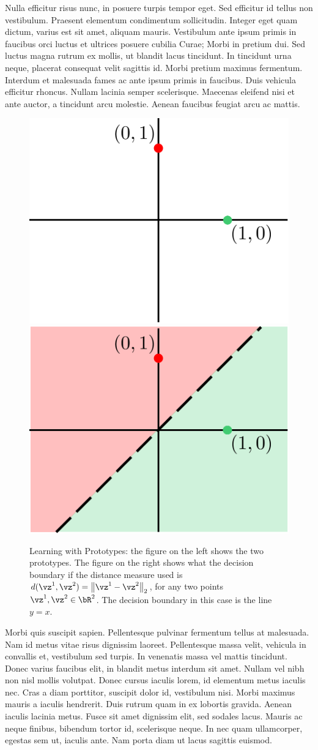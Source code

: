 \documentclass[a4paper,11pt]{article}
\begin{document}
\begin{mlsolution}
Nulla efficitur risus nunc, in posuere turpis tempor eget. Sed efficitur id tellus non vestibulum. Praesent elementum condimentum sollicitudin. Integer eget quam dictum, varius est sit amet, aliquam mauris. Vestibulum ante ipsum primis in faucibus orci luctus et ultrices posuere cubilia Curae; Morbi in pretium dui. Sed luctus magna rutrum ex mollis, ut blandit lacus tincidunt. In tincidunt urna neque, placerat consequat velit sagittis id. Morbi pretium maximus fermentum. Interdum et malesuada fames ac ante ipsum primis in faucibus. Duis vehicula efficitur rhoncus. Nullam lacinia semper scelerisque. Maecenas eleifend nisi et ante auctor, a tincidunt arcu molestie. Aenean faucibus feugiat arcu ac mattis.
\begin{figure}[th]%
\centering
\includegraphics[width=0.5\columnwidth]{proto_blank.png}%
\hfill
\includegraphics[width=0.5\columnwidth]{proto_euclid_sample.png}%
\caption{Learning with Prototypes: the figure on the left shows the two prototypes. The figure on the right shows what the decision boundary if the distance measure used is $d(\vz^1,\vz^2) = \norm{\vz^1-\vz^2}_2$, for any two points $\vz^1,\vz^2 \in \bR^2$. The decision boundary in this case is the line $y = x$.}%
\label{fig:proto}%
\end{figure}
Morbi quis suscipit sapien. Pellentesque pulvinar fermentum tellus at malesuada. Nam id metus vitae risus dignissim laoreet. Pellentesque massa velit, vehicula in convallis et, vestibulum sed turpis. In venenatis massa vel mattis tincidunt. Donec varius faucibus elit, in blandit metus interdum sit amet. Nullam vel nibh non nisl mollis volutpat. Donec cursus iaculis lorem, id elementum metus iaculis nec. Cras a diam porttitor, suscipit dolor id, vestibulum nisi. Morbi maximus mauris a iaculis hendrerit. Duis rutrum quam in ex lobortis gravida. Aenean iaculis lacinia metus. Fusce sit amet dignissim elit, sed sodales lacus. Mauris ac neque finibus, bibendum tortor id, scelerisque neque. In nec quam ullamcorper, egestas sem ut, iaculis ante. Nam porta diam ut lacus sagittis euismod. 
\end{mlsolution}
\end{document}
